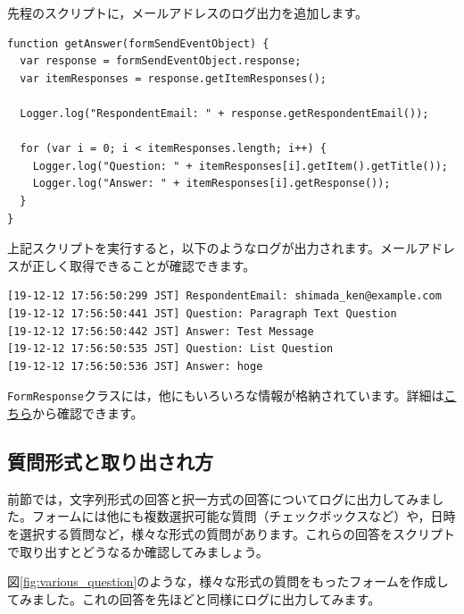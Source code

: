 \documentclass[uplatex,a4j]{jsarticle}
\begin{document}
先程のスクリプトに，メールアドレスのログ出力を追加します。

\begin{lstlisting}[basicstyle=\ttfamily\footnotesize,frame=single,caption=Event Object sample 5]
function getAnswer(formSendEventObject) {
  var response = formSendEventObject.response;
  var itemResponses = response.getItemResponses();
  
  Logger.log("RespondentEmail: " + response.getRespondentEmail());
  
  for (var i = 0; i < itemResponses.length; i++) {
    Logger.log("Question: " + itemResponses[i].getItem().getTitle());
    Logger.log("Answer: " + itemResponses[i].getResponse());
  }
}
\end{lstlisting}

上記スクリプトを実行すると，以下のようなログが出力されます。メールアドレスが正しく取得できることが確認できます。

\begin{lstlisting}[basicstyle=\ttfamily\footnotesize,frame=single,caption=Event Object output example 4]
[19-12-12 17:56:50:299 JST] RespondentEmail: shimada_ken@example.com
[19-12-12 17:56:50:441 JST] Question: Paragraph Text Question
[19-12-12 17:56:50:442 JST] Answer: Test Message
[19-12-12 17:56:50:535 JST] Question: List Question
[19-12-12 17:56:50:536 JST] Answer: hoge
\end{lstlisting}


\verb|FormResponse|クラスには，他にもいろいろな情報が格納されています。詳細は\href{https://developers.google.com/apps-script/reference/forms/form-response?hl=en}{こちら}から確認できます。

\subsection{質問形式と取り出され方}


前節では，文字列形式の回答と択一方式の回答についてログに出力してみました。フォームには他にも複数選択可能な質問（チェックボックスなど）や，日時を選択する質問など，様々な形式の質問があります。これらの回答をスクリプトで取り出すとどうなるか確認してみましょう。

図\ref{fig:various_question}のような，様々な形式の質問をもったフォームを作成してみました。これの回答を先ほどと同様にログに出力してみます。
\end{document}
